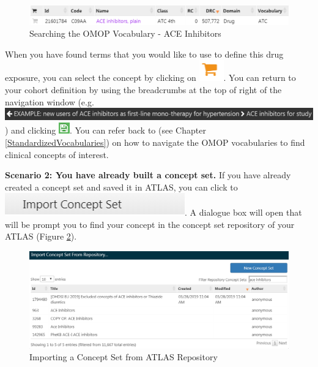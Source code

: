 \documentclass[11pt]{book}
\theoremstyle{definition}
\theoremstyle{definition}
\theoremstyle{definition}
\theoremstyle{remark}
\begin{document}
\begin{figure}

{\centering \includegraphics[width=0.9\linewidth]{images/Cohorts/aceinhibitors} 

}

\caption{Searching the OMOP Vocabulary - ACE Inhibitors}\label{fig:aceinhibitors}
\end{figure}

When you have found terms that you would like to use to define this drug exposure, you can select the concept by clicking on \includegraphics{images/Cohorts/shoppingcart.png}. You can return to your cohort definition by using the breadcrumbs at the top of right of the navigation window (e.g.~\includegraphics{images/Cohorts/breadcrumbs.png}) and clicking \includegraphics{images/Cohorts/save.png}. You can refer back to (see Chapter \ref{StandardizedVocabularies}) on how to navigate the OMOP vocabularies to find clinical concepts of interest.

\textbf{Scenario 2: You have already built a concept set.} If you have already created a concept set and saved it in ATLAS, you can click to \includegraphics{images/Cohorts/importaconcept-2.png}. A dialogue box will open that will be prompt you to find your concept in the concept set repository of your ATLAS (Figure \ref{fig:ATLASfindyourconcept}).

\begin{figure}

{\centering \includegraphics[width=0.9\linewidth]{images/Cohorts/ATLAS-findingyourconcept} 

}

\caption{Importing a Concept Set from ATLAS Repository}\label{fig:ATLASfindyourconcept}
\end{figure}
\end{document}
